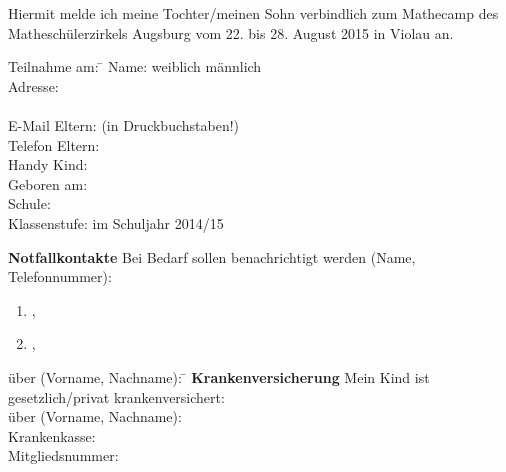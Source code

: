 \documentclass[13pt]{zettel}
\begin{document}
\renewcommand{\betreff}{Anmeldung zum Mathecamp des Matheschülerzirkels Augsburg}


Hiermit melde ich meine Tochter/meinen Sohn verbindlich zum Mathecamp des
Matheschülerzirkels Augsburg vom 22. bis 28. August 2015 in
Violau an.

\vspace{-1.0em}
\doublespacing
\begin{tabbing}
  Teilnahme am: \= \kill
  Name: \> \freistLang \checkbox weiblich \checkbox männlich \\
  Adresse: \> \freistLang \\
  \> \freistLang \\
  E-Mail Eltern: \> \freistLang{} (in Druckbuchstaben!) \\
  Telefon Eltern: \> \freistLang \\
  Handy Kind: \> \freistLang \\
  Geboren am: \> \freistLang \\
  Schule: \> \freistLang \\
  Klassenstufe: \> \freistKurz{} im Schuljahr 2014/15
\end{tabbing}

\vspace{-0.8cm}
\begin{shaded}
\textbf{Notfallkontakte} Bei Bedarf sollen benachrichtigt werden (Name, Telefonnummer):
\begin{enumerate}
\item \freist{7cm},\quad\freist{7cm}
\item \freist{7cm},\quad\freist{7cm}
\end{enumerate}
\end{shaded}

\enlargethispage{2cm}
\vspace{-1.0cm}
\begin{shaded}
\vspace{-2.2em}
\begin{tabbing}
über (Vorname, Nachname): \= \kill
\textbf{Krankenversicherung} Mein Kind ist gesetzlich/privat krankenversichert: \\
über (Vorname, Nachname): \> \freistLang \\
Krankenkasse: \> \freistLang \\
Mitgliedsnummer: \> \freistLang
\end{tabbing}
\vspace{-1.5em}
\end{shaded}
\end{document}
